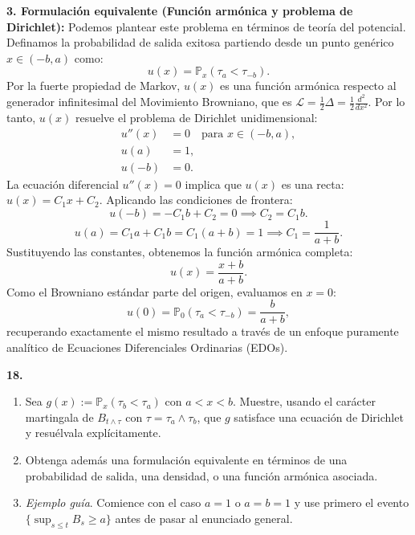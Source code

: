 \documentclass[11pt, letterpaper]{article}
\begin{document}
\begin{solucion}
    \textbf{3. Formulación equivalente (Función armónica y problema de Dirichlet):}
    Podemos plantear este problema en términos de teoría del potencial. Definamos la probabilidad de salida exitosa partiendo desde un punto genérico $x \in (-b, a)$ como:
    \[ u(x) = \mathbb{P}_x(\tau_a < \tau_{-b}). \]
    Por la fuerte propiedad de Markov, $u(x)$ es una función armónica respecto al generador infinitesimal del Movimiento Browniano, que es $\mathcal{L} = \frac{1}{2}\Delta = \frac{1}{2}\frac{d^2}{dx^2}$.
    Por lo tanto, $u(x)$ resuelve el problema de Dirichlet unidimensional:
    \begin{align*}
        u''(x) &= 0 \quad \text{para } x \in (-b, a), \\
        u(a) &= 1, \\
        u(-b) &= 0.
    \end{align*}
    La ecuación diferencial $u''(x) = 0$ implica que $u(x)$ es una recta: $u(x) = C_1 x + C_2$.
    Aplicando las condiciones de frontera:
    \[ u(-b) = -C_1 b + C_2 = 0 \implies C_2 = C_1 b. \]
    \[ u(a) = C_1 a + C_1 b = C_1(a+b) = 1 \implies C_1 = \frac{1}{a+b}. \]
    Sustituyendo las constantes, obtenemos la función armónica completa:
    \[ u(x) = \frac{x + b}{a + b}. \]
    Como el Browniano estándar parte del origen, evaluamos en $x=0$:
    \[ u(0) = \mathbb{P}_0(\tau_a < \tau_{-b}) = \frac{b}{a+b}, \]
    recuperando exactamente el mismo resultado a través de un enfoque puramente analítico de Ecuaciones Diferenciales Ordinarias (EDOs).
\end{solucion}

\newpage

\begin{ejercicio}
    \textbf{18.} 
    \begin{enumerate}
        \item Sea $g(x) := \mathbb{P}_x(\tau_b < \tau_a)$ con $a < x < b$. Muestre, usando el carácter martingala de $B_{t \wedge \tau}$ con $\tau = \tau_a \wedge \tau_b$, que $g$ satisface una ecuación de Dirichlet y resuélvala explícitamente.
        \item Obtenga además una formulación equivalente en términos de una probabilidad de salida, una densidad, o una función armónica asociada.
        \item \textit{Ejemplo guía}. Comience con el caso $a = 1$ o $a = b = 1$ y use primero el evento $\{\sup_{s \le t} B_s \ge a\}$ antes de pasar al enunciado general.
    \end{enumerate}
\end{ejercicio}
\end{document}

